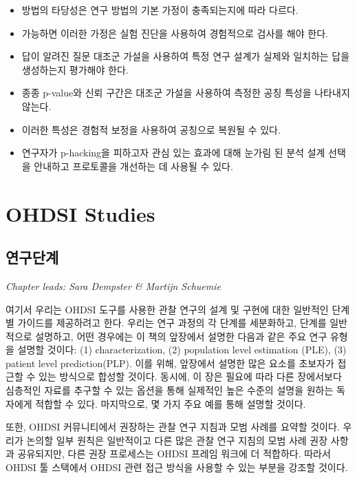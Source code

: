 \documentclass[11pt]{book}
\theoremstyle{definition}
\theoremstyle{definition}
\theoremstyle{definition}
\theoremstyle{remark}
\let\BeginKnitrBlock\begin \let\EndKnitrBlock\end
\begin{document}
\BeginKnitrBlock{rmdsummary}
\begin{itemize}
\item
  방법의 타당성은 연구 방법의 기본 가정이 충족되는지에 따라 다르다.
\item
  가능하면 이러한 가정은 실험 진단을 사용하여 경험적으로 검사를 해야
  한다.
\item
  답이 알려진 질문 대조군 가설을 사용하여 특정 연구 설계가 실제와
  일치하는 답을 생성하는지 평가해야 한다.
\item
  종종 p-value와 신뢰 구간은 대조군 가설을 사용하여 측정한 공칭 특성을
  나타내지 않는다.
\item
  이러한 특성은 경험적 보정을 사용하여 공칭으로 복원될 수 있다.
\item
  연구자가 p-hacking을 피하고자 관심 있는 효과에 대해 눈가림 된 분석
  설계 선택을 안내하고 프로토콜을 개선하는 데 사용될 수 있다.
\end{itemize}
\EndKnitrBlock{rmdsummary}

\part{OHDSI Studies}\label{part-ohdsi-studies}

\chapter{연구단계}\label{StudySteps}

\emph{Chapter leads: Sara Dempster \& Martijn Schuemie}

여기서 우리는 OHDSI 도구를 사용한 관찰 연구의 설계 및 구현에 대한
일반적인 단계별 가이드를 제공하려고 한다. 우리는 연구 과정의 각 단계를
세분화하고, 단계를 일반적으로 설명하고, 어떤 경우에는 이 책의 앞장에서
설명한 다음과 같은 주요 연구 유형을 설명할 것이다: (1) characterization,
(2) population level estimation (PLE), (3) patient level
prediction(PLP). 이를 위해, 앞장에서 설명한 많은 요소를 초보자가 접근할
수 있는 방식으로 합성할 것이다. 동시에, 이 장은 필요에 따라 다른
장에서보다 심층적인 자료를 추구할 수 있는 옵션을 통해 실제적인 높은
수준의 설명을 원하는 독자에게 적합할 수 있다. 마지막으로, 몇 가지 주요
예를 통해 설명할 것이다.

또한, OHDSI 커뮤니티에서 권장하는 관찰 연구 지침과 모범 사례를 요약할
것이다. 우리가 논의할 일부 원칙은 일반적이고 다른 많은 관찰 연구 지침의
모범 사례 권장 사항과 공유되지만, 다른 권장 프로세스는 OHDSI 프레임
워크에 더 적합하다. 따라서 OHDSI 툴 스택에서 OHDSI 관련 접근 방식을
사용할 수 있는 부분을 강조할 것이다.
\end{document}
